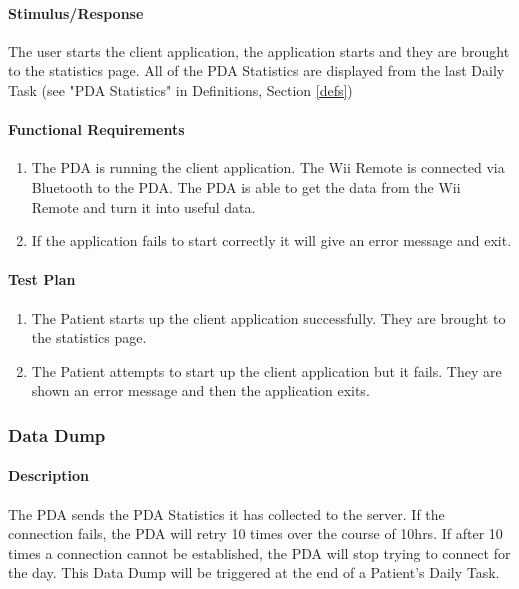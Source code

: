 \documentclass{article}
\begin{document}
\paragraph{Stimulus/Response}
The user starts the client application, the application starts and they are brought to the statistics page. All of the PDA Statistics
are displayed from the last Daily Task (see "PDA Statistics" in Definitions, Section \ref{defs})

\paragraph{Functional Requirements}
\begin{enumerate}
\item The PDA is running the client application.  The Wii Remote is connected via Bluetooth to the PDA.  The PDA is able to get the data from the Wii Remote and turn it into useful data.
\item If the application fails to start correctly it will give an error message and exit.
\end{enumerate}

\paragraph{Test Plan}
\begin{enumerate}
\item The Patient starts up the client application successfully.  They are brought to the statistics page.
\item The Patient attempts to start up the client application but it fails.  They are shown an error message and then the application exits.
\end{enumerate}

\subsubsection{Data Dump}\label{sec: Data Dump}

\paragraph{Description}
The PDA sends the PDA Statistics it has collected to the server.  If the connection fails, the PDA will retry 10 times over the course of 10hrs. If after 10 times a connection cannot be established, the PDA will stop trying to connect for the day.
This Data Dump will be triggered at the end of a Patient's Daily Task.
\end{document}
